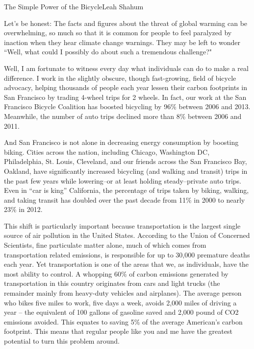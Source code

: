 \documentclass{papertex}
\begin{document}
\begin{news}{2}{The Simple Power of the Bicycle}{Leah Shahum}{}{}

Let's be honest: The facts and figures about the threat of global warming can be
overwhelming, so much so that it is common for people to feel paralyzed by
inaction when they hear climate change warnings. They may be left to wonder
``Well, what could I possibly do about such a tremendous challenge?"

Well, I am fortunate to witness every day what individuals can do to make a real
difference. I work in the slightly obscure, though fast-growing, field of
bicycle advocacy, helping thousands of people each year lessen their carbon
footprints in San Francisco by trading 4-wheel trips for 2 wheels. In fact, our
work at the San Francisco Bicycle Coalition has boosted bicycling by 96\%
between 2006 and 2013. Meanwhile, the number of auto trips declined more than
8\% between 2006 and 2011.

And San Francisco is not alone in decreasing energy consumption by boosting
biking. Cities across the nation, including Chicago, Washington DC,
Philadelphia, St. Louis, Cleveland, and our friends across the San Francisco
Bay, Oakland, have significantly increased bicycling (and walking and transit)
trips in the past few years while lowering–or at least holding steady–private
auto trips. Even in “car is king” California, the percentage of trips taken by
biking, walking, and taking transit has doubled over the past decade from 11\%
in 2000 to nearly 23\% in 2012.

This shift is particularly important because transportation is the largest
single source of air pollution in the United States. According to the Union of
Concerned Scientists, fine particulate matter alone, much of which comes from
transportation related emissions, is responsible for up to 30,000 premature
deaths each year. Yet transportation is one of the areas that we, as
individuals, have the most ability to control. A whopping 60\% of carbon
emissions generated by transportation in this country originates from cars and
light trucks (the remainder mainly from heavy-duty vehicles and airplanes). The
average person who bikes five miles to work, five days a week, avoids 2,000
miles of driving a year – the equivalent of 100 gallons of gasoline saved and
2,000 pound of CO2 emissions avoided. This equates to saving 5\% of the average
American’s carbon footprint. This means that regular people like you and me have
the greatest potential to turn this problem around.


\end{news}
\end{document}
